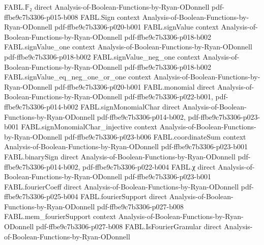 \begin{theorem}
\label{FABL.isVectorFourierGranular_signValue_spectralSparsity}
\leanok
{}
\proofstep
  {FABL.𝔽₂}
  {direct}
  {Analysis-of-Boolean-Functions-by-Ryan-ODonnell}
  {pdf-ffbe9c7b3306-p015-b008}
\proofstep
  {FABL.Sign}
  {context}
  {Analysis-of-Boolean-Functions-by-Ryan-ODonnell}
  {pdf-ffbe9c7b3306-p020-b001}
\proofstep
  {FABL.signValue}
  {context}
  {Analysis-of-Boolean-Functions-by-Ryan-ODonnell}
  {pdf-ffbe9c7b3306-p018-b002}
\proofstep
  {FABL.signValue_one}
  {context}
  {Analysis-of-Boolean-Functions-by-Ryan-ODonnell}
  {pdf-ffbe9c7b3306-p018-b002}
\proofstep
  {FABL.signValue_neg_one}
  {context}
  {Analysis-of-Boolean-Functions-by-Ryan-ODonnell}
  {pdf-ffbe9c7b3306-p018-b002}
\proofstep
  {FABL.signValue_eq_neg_one_or_one}
  {context}
  {Analysis-of-Boolean-Functions-by-Ryan-ODonnell}
  {pdf-ffbe9c7b3306-p020-b001}
\proofstep
  {FABL.monomial}
  {direct}
  {Analysis-of-Boolean-Functions-by-Ryan-ODonnell}
  {pdf-ffbe9c7b3306-p022-b001,
    pdf-ffbe9c7b3306-p014-b002}
\proofstep
  {FABL.signMonomialChar}
  {direct}
  {Analysis-of-Boolean-Functions-by-Ryan-ODonnell}
  {pdf-ffbe9c7b3306-p014-b002,
    pdf-ffbe9c7b3306-p023-b001}
\proofstep
  {FABL.signMonomialChar_injective}
  {context}
  {Analysis-of-Boolean-Functions-by-Ryan-ODonnell}
  {pdf-ffbe9c7b3306-p023-b006}
\proofstep
  {FABL.coordinateSum}
  {context}
  {Analysis-of-Boolean-Functions-by-Ryan-ODonnell}
  {pdf-ffbe9c7b3306-p023-b001}
\proofstep
  {FABL.binarySign}
  {direct}
  {Analysis-of-Boolean-Functions-by-Ryan-ODonnell}
  {pdf-ffbe9c7b3306-p014-b002,
    pdf-ffbe9c7b3306-p022-b004}
\proofstep
  {FABL.χ}
  {direct}
  {Analysis-of-Boolean-Functions-by-Ryan-ODonnell}
  {pdf-ffbe9c7b3306-p023-b001}
\proofstep
  {FABL.fourierCoeff}
  {direct}
  {Analysis-of-Boolean-Functions-by-Ryan-ODonnell}
  {pdf-ffbe9c7b3306-p025-b004}
\proofstep
  {FABL.fourierSupport}
  {direct}
  {Analysis-of-Boolean-Functions-by-Ryan-ODonnell}
  {pdf-ffbe9c7b3306-p027-b008}
\proofstep
  {FABL.mem_fourierSupport}
  {context}
  {Analysis-of-Boolean-Functions-by-Ryan-ODonnell}
  {pdf-ffbe9c7b3306-p027-b008}
\proofstep
  {FABL.IsFourierGranular}
  {direct}
  {Analysis-of-Boolean-Functions-by-Ryan-ODonnell}

\end{theorem}
